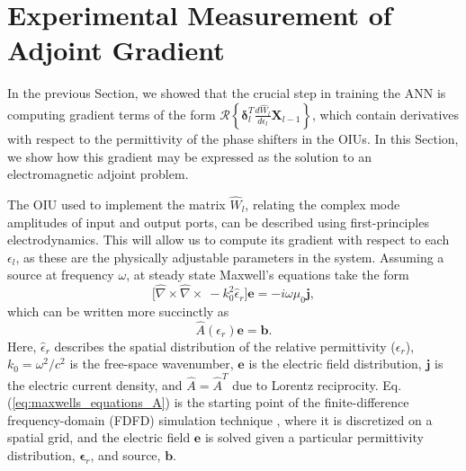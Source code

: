 \section{Experimental Measurement of Adjoint Gradient}

In the previous Section, we showed that the crucial step in training the ANN is computing gradient terms of the form  $\mathcal{R}\left\{\boldsymbol{\delta}_l^T \frac{d \hat{W}_l}{d\epsilon_l} \mathbf{X}_{l-1}\right\}$, which contain derivatives with respect to the permittivity of the phase shifters in the OIUs. In this Section, we show how this gradient may be expressed as the solution to an electromagnetic adjoint problem.

The OIU used to implement the matrix $\hat{W}_l$, relating the complex mode amplitudes of input and output ports, can be described using first-principles electrodynamics.  This will allow us to compute its gradient with respect to each $\epsilon_l$, as these are the physically adjustable parameters in the system. Assuming a source at frequency $\omega$, at steady state Maxwell's equations take the form 
\begin{equation}
\Big[ \hat{\nabla} \times \hat{\nabla} \times ~ -k_0^2 \hat{\epsilon}_r \Big]\mathbf{e} = -i\omega \mu_0 \mathbf{j},
\label{eq:maxwells_equations_physics}
\end{equation}
which can be written more succinctly as
\begin{equation}
\hat{A}(\epsilon_r) \mathbf{e} = \mathbf{b}
\label{eq:maxwells_equations_A}.
\end{equation}
Here, $\hat{\epsilon}_r$ describes the spatial distribution of the relative permittivity ($\epsilon_r$), $k_0=\omega^2/c^2$ is the free-space wavenumber, $\mathbf{e}$ is the electric field distribution, $\mathbf{j}$ is the electric current density, and $\hat{A} = \hat{A}^T$ due to Lorentz reciprocity. Eq. (\ref{eq:maxwells_equations_A}) is the starting point of the finite-difference frequency-domain (FDFD) simulation technique \cite{shin2012choice}, where it is discretized on a spatial grid, and the electric field $\mathbf{e}$ is solved given a particular permittivity distribution, $\boldsymbol{\epsilon}_r$, and source, $\mathbf{b}$.

